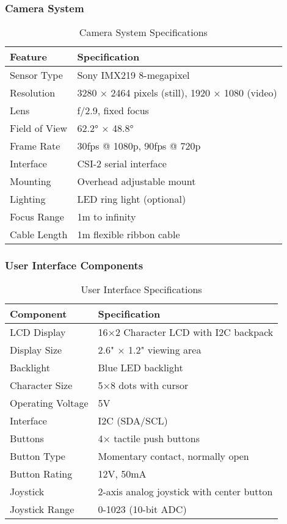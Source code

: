 \subsubsection{Camera System}

\begin{table}[H]
\centering
\caption{Camera System Specifications}
\begin{tabular}{|l|l|}
\hline
\textbf{Feature} & \textbf{Specification} \\
\hline
Sensor Type & Sony IMX219 8-megapixel \\
Resolution & 3280 × 2464 pixels (still), 1920 × 1080 (video) \\
Lens & f/2.9, fixed focus \\
Field of View & 62.2° × 48.8° \\
Frame Rate & 30fps @ 1080p, 90fps @ 720p \\
Interface & CSI-2 serial interface \\
Mounting & Overhead adjustable mount \\
Lighting & LED ring light (optional) \\
Focus Range & 1m to infinity \\
Cable Length & 1m flexible ribbon cable \\
\hline
\end{tabular}
\label{tab:camera}
\end{table}

\subsubsection{User Interface Components}

\begin{table}[H]
\centering
\caption{User Interface Specifications}
\begin{tabular}{|l|l|}
\hline
\textbf{Component} & \textbf{Specification} \\
\hline
LCD Display & 16×2 Character LCD with I2C backpack \\
Display Size & 2.6" × 1.2" viewing area \\
Backlight & Blue LED backlight \\
Character Size & 5×8 dots with cursor \\
Operating Voltage & 5V \\
Interface & I2C (SDA/SCL) \\
Buttons & 4× tactile push buttons \\
Button Type & Momentary contact, normally open \\
Button Rating & 12V, 50mA \\
Joystick & 2-axis analog joystick with center button \\
Joystick Range & 0-1023 (10-bit ADC) \\
\hline
\end{tabular}
\label{tab:ui}
\end{table}

